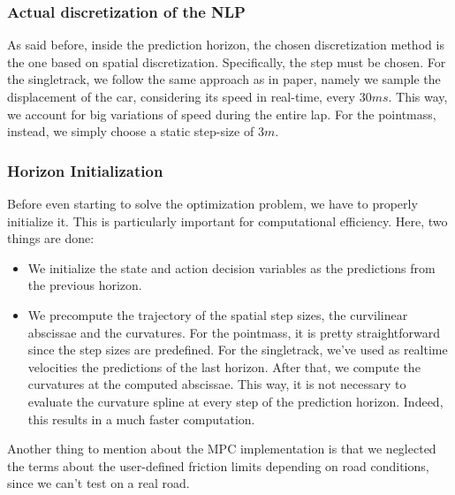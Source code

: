 \documentclass[a4paper, onecolumn, 12pt]{article}
\begin{document}
\subsubsection*{Actual discretization of the NLP}
As said before, inside the prediction horizon, the chosen discretization method
is the one based on spatial discretization. Specifically, the step must be
chosen. For the singletrack, we follow the same approach as in paper, namely
we sample the displacement of the car, considering its speed in real-time,
every $30ms$. This way, we account for big variations of speed during the
entire lap. For the pointmass, instead, we simply choose a static step-size
of $3m$.
\subsubsection*{Horizon Initialization}
Before even starting to solve the optimization problem, we have to properly
initialize it. This is particularly important for computational efficiency.
Here, two things are done:
\begin{itemize}
    \item We initialize the state and action decision variables as the
    predictions from the previous horizon.
    \item We precompute the trajectory of the spatial step sizes, the
    curvilinear abscissae and the curvatures. For the pointmass, it is
    pretty straightforward since the step sizes are predefined. For the
    singletrack, we've used as realtime velocities the predictions of the
    last horizon. After that, we compute the curvatures at the computed
    abscissae. This way, it is not necessary to evaluate the curvature
    spline at every step of the prediction horizon. Indeed, this results in
    a much faster computation.
\end{itemize}
Another thing to mention about the MPC implementation is that we neglected the
terms about the user-defined friction limits depending on road conditions, since
we can't test on a real road. 
\end{document}
